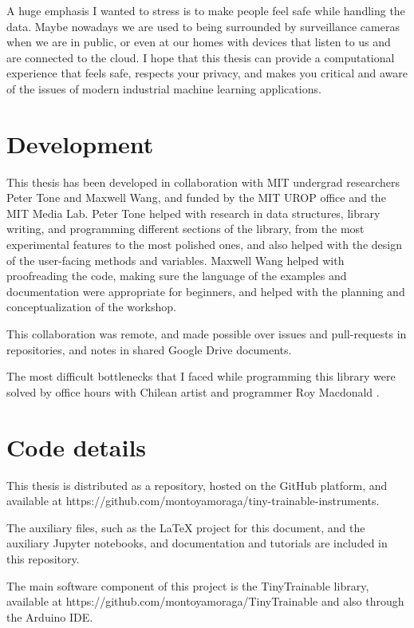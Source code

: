 A huge emphasis I wanted to stress is to make people feel safe while handling the data. Maybe nowadays we are used to being surrounded by surveillance cameras when we are in public, or even at our homes with devices that listen to us and are connected to the cloud. I hope that this thesis can provide a computational experience that feels safe, respects your privacy, and makes you critical and aware of the issues of modern industrial machine learning applications.

\section{Development}

This thesis has been developed in collaboration with MIT undergrad researchers Peter Tone and Maxwell Wang, and funded by the MIT UROP office and the MIT Media Lab. Peter Tone helped with research in data structures, library writing, and programming different sections of the library, from the most experimental features to the most polished ones, and also helped with the design of the user-facing methods and variables. Maxwell Wang helped with proofreading the code, making sure the language of the examples and documentation were appropriate for beginners, and helped with the planning and conceptualization of the workshop. 

This collaboration was remote, and made possible over issues and \glspl{pull-request} in repositories, and notes in shared Google Drive documents.

The most difficult bottlenecks that I faced while programming this library were solved by office hours with Chilean artist and programmer Roy Macdonald \cite{website-roy-macdonald}.

\section{Code details}

This thesis is distributed as a repository, hosted on the GitHub platform, and available at https://github.com/montoyamoraga/tiny-trainable-instruments.

The auxiliary files, such as the LaTeX project for this document, and the auxiliary Jupyter notebooks, and documentation and tutorials are included in this repository.

The main software component of this project is the TinyTrainable library, available at https://github.com/montoyamoraga/TinyTrainable and also through the Arduino \acrshort{IDE}.

